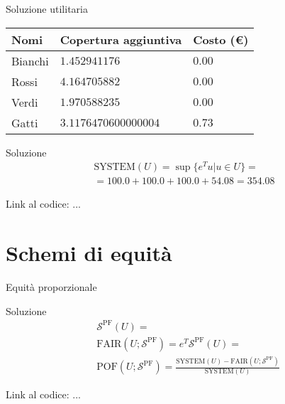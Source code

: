 \documentclass{beamer}
\begin{document}
\begin{frame}{Soluzione utilitaria}
	\begin{center}
		\begin{tabular}{|l|l|l|}
		\hline
		\textbf{Nomi} & \textbf{Copertura aggiuntiva} & \textbf{Costo (\euro)}\\
		\hline
		Bianchi & $1.452941176$ & $0.00$ \\
		Rossi & $4.164705882$ & $0.00$ \\
		Verdi & $1.970588235$ & $0.00$ \\
		Gatti & $3.1176470600000004$ & $0.73$ \\
		\hline
	\end{tabular}
	\end{center}
	\begin{block}{Soluzione}
		\vspace{-0.5cm}
		\begin{equation}
			\begin{split}
				\text{SYSTEM}(U) = \sup \{e^T u | u \in U\} = \\
				=  100.0 + 100.0 + 100.0 + 54.08 = 354.08
			\end{split}
		\end{equation}
	\vspace{-0.3cm}
	\end{block}
	Link al codice: ...
\end{frame}

\section{Schemi di equità}

\begin{frame}{Equità proporzionale}
	\begin{block}{Soluzione}
		\vspace{-0.7cm}
		\begin{equation}
			\begin{split}
				& \mathcal{S}^{\text{PF}}(U) = \\
				& \text{FAIR}(U;\mathcal{S}^{\text{PF}}) = e^T \mathcal{S}^{\text{PF}}(U) = \\
				& \text{POF}(U;\mathcal{S}^{\text{PF}}) = \frac{\text{SYSTEM}(U) - \text{FAIR}(U;\mathcal{S}^{\text{PF}})}{\text{SYSTEM}(U)}
			\end{split}
		\end{equation}
	\vspace{-0.4cm}
	\end{block}
	Link al codice: ...
\end{frame}
\end{document}
